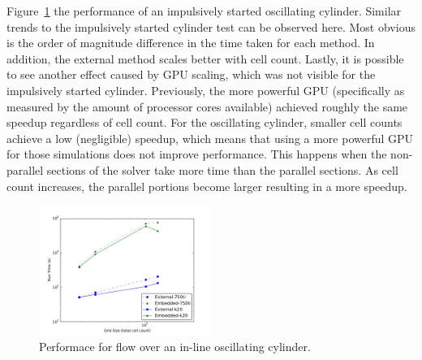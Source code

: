\documentclass[preprint,12pt,5p]{elsarticle}
\begin{document}
Figure~\ref{fig:oscperf} the performance of an impulsively started oscillating cylinder. 
Similar trends to the impulsively started cylinder test can be observed here.
Most obvious is the order of magnitude difference in the time taken for each method. 
In addition, the external method scales better with cell count. 
Lastly, it is possible to see another effect caused by GPU scaling, which was not visible for the impulsively started cylinder. 
Previously, the more powerful GPU (specifically as measured by the amount of processor cores available) achieved roughly the same speedup regardless of cell count. 
For the oscillating cylinder, smaller cell counts achieve a low (negligible) speedup, which means that using a more powerful GPU for those simulations does not improve performance. 
This happens when the non-parallel sections of the solver take more time than the parallel sections. 
As cell count increases, the parallel portions become larger resulting in a more speedup. 
\begin{figure}[!htb]
	\centering
	\includegraphics[width=0.5\textwidth]{osc_performance}
	\caption{Performace for flow over an in-line oscillating cylinder.}
	\label{fig:oscperf}
\end{figure}
\end{document}
